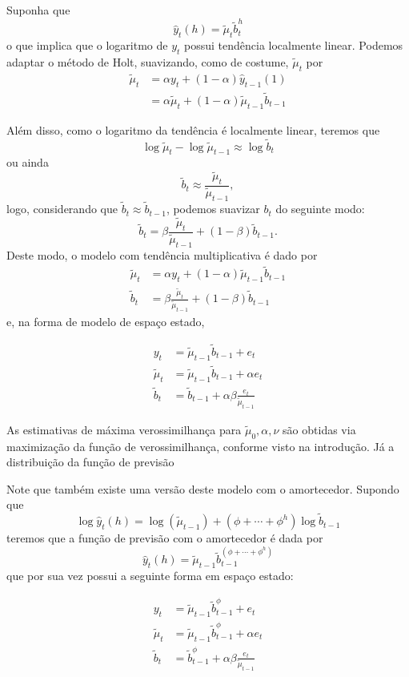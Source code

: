 \documentclass[
  letterpaper,
  DIV=11,
  numbers=noendperiod]{scrartcl}
\theoremstyle{definition}
\theoremstyle{definition}
\theoremstyle{plain}
\theoremstyle{plain}
\theoremstyle{remark}
\begin{document}
Suponha que \[\hat{y}_t(h)=\tilde{\mu}_t\tilde{b}_t^h\] o que implica
que o logaritmo de \(y_t\) possui tendência localmente linear. Podemos
adaptar o método de Holt, suavizando, como de costume, \(\tilde{\mu}_t\)
por \begin{align}\tilde{\mu}_t&=\alpha y_t+(1-\alpha)\hat{y}_{t-1}(1)\\
&=\alpha\tilde{\mu}_{t}+(1-\alpha)\tilde{\mu}_{t-1}\tilde{b}_{t-1}\end{align}

Além disso, como o logaritmo da tendência é localmente linear, teremos
que \[\log \tilde{\mu}_t-\log\tilde{\mu}_{t-1}\approx \log\tilde{b}_t\]
ou ainda \[\tilde{b}_t\approx \frac{\tilde{\mu}_t}{\tilde{\mu}_{t-1}},\]
logo, considerando que \(\tilde{b}_t\approx \tilde{b}_{t-1}\), podemos
suavizar \(b_t\) do seguinte modo:
\[\tilde{b}_t=\beta\frac{\tilde{\mu}_t}{\tilde{\mu}_{t-1}}+(1-\beta)\tilde{b}_{t-1}.\]
Deste modo, o modelo com tendência multiplicativa é dado por
\begin{align}
\tilde{\mu}_t&=\alpha y_t+(1-\alpha)\tilde{\mu}_{t-1}\tilde{b}_{t-1}\\
\tilde{b}_t&=\beta\frac{\tilde{\mu}_t}{\tilde{\mu}_{t-1}}+(1-\beta)\tilde{b}_{t-1}
\end{align} e, na forma de modelo de espaço estado,

\begin{align}
y_t&=\tilde{\mu}_{t-1}\tilde{b}_{t-1}+e_t\\
\tilde{\mu}_t&=\tilde{\mu}_{t-1}\tilde{b}_{t-1}+\alpha e_t\\
\tilde{b}_t&=\tilde{b}_{t-1}+\alpha\beta\frac{e_t}{\tilde{\mu}_{t-1}}
\end{align}

As estimativas de máxima verossimilhança para
\(\tilde{\mu}_0,\alpha,\nu\) são obtidas via maximização da função de
verossimilhança, conforme visto na introdução. Já a distribuição da
função de previsão

Note que também existe uma versão deste modelo com o amortecedor.
Supondo que
\[\log \hat{y}_t(h)=\log(\tilde{\mu}_{t-1})+(\phi+\cdots+\phi^h)\log\tilde{b}_{t-1}\]
teremos que a função de previsão com o amortecedor é dada por
\[\hat{y}_t(h)=\tilde{\mu}_{t-1}\tilde{b}_{t-1}^{(\phi+\cdots+\phi^h)}\]
que por sua vez possui a seguinte forma em espaço estado:

\begin{align}
y_t&=\tilde{\mu}_{t-1}\tilde{b}_{t-1}^\phi+e_t\\
\tilde{\mu}_t&=\tilde{\mu}_{t-1}\tilde{b}_{t-1}^\phi+\alpha e_t\\
\tilde{b}_t&=\tilde{b}_{t-1}^\phi+\alpha\beta\frac{e_t}{\tilde{\mu}_{t-1}}
\end{align}
\end{document}
